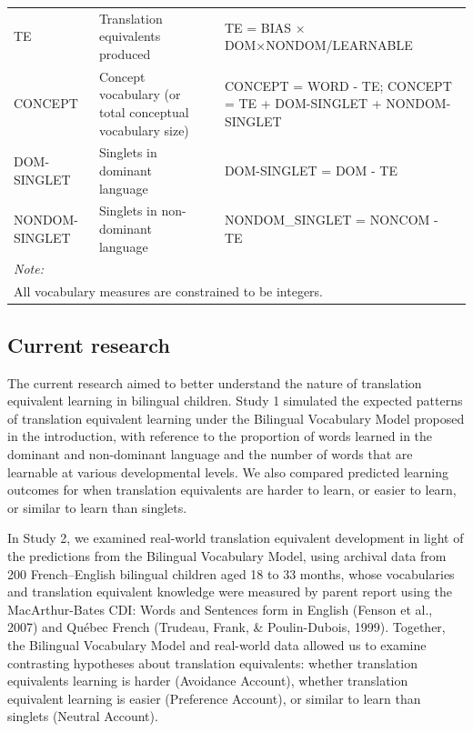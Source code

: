 \documentclass[
  english,
  ,man,floatsintext]{apa6}
\begin{document}
\begin{landscape}
\begin{table}
\begin{tabular}[t]{l>{\raggedright\arraybackslash}p{175px}>{\raggedright\arraybackslash}p{175px}>{\raggedright\arraybackslash}p{175px}}
\hspace{1em}TE & Translation equivalents produced &  & TE = BIAS × DOM×NONDOM/LEARNABLE\\
\hspace{1em}CONCEPT & Concept vocabulary (or total conceptual vocabulary size) &  & CONCEPT = WORD - TE; CONCEPT = TE + DOM-SINGLET + NONDOM-SINGLET\\
\hspace{1em}DOM-SINGLET & Singlets in dominant language &  & DOM-SINGLET = DOM - TE\\
\hspace{1em}NONDOM-SINGLET & Singlets in non-dominant language &  & NONDOM\_SINGLET = NONCOM - TE\\
\bottomrule
\multicolumn{4}{l}{\rule{0pt}{1em}\textit{Note: }}\\
\multicolumn{4}{l}{\rule{0pt}{1em}All vocabulary measures are constrained to be integers.}\\
\end{tabular}
\end{table}
\end{landscape}

\hypertarget{current-research}{%
\subsection{Current research}\label{current-research}}

The current research aimed to better understand the nature of translation equivalent learning in bilingual children. Study 1 simulated the expected patterns of translation equivalent learning under the Bilingual Vocabulary Model proposed in the introduction, with reference to the proportion of words learned in the dominant and non-dominant language and the number of words that are learnable at various developmental levels. We also compared predicted learning outcomes for when translation equivalents are harder to learn, or easier to learn, or similar to learn than singlets.

In Study 2, we examined real-world translation equivalent development in light of the predictions from the Bilingual Vocabulary Model, using archival data from 200 French--English bilingual children aged 18 to 33 months, whose vocabularies and translation equivalent knowledge were measured by parent report using the MacArthur-Bates CDI: Words and Sentences form in English (Fenson et al., 2007) and Québec French (Trudeau, Frank, \& Poulin-Dubois, 1999). Together, the Bilingual Vocabulary Model and real-world data allowed us to examine contrasting hypotheses about translation equivalents: whether translation equivalents learning is harder (Avoidance Account), whether translation equivalent learning is easier (Preference Account), or similar to learn than singlets (Neutral Account).
\end{document}
